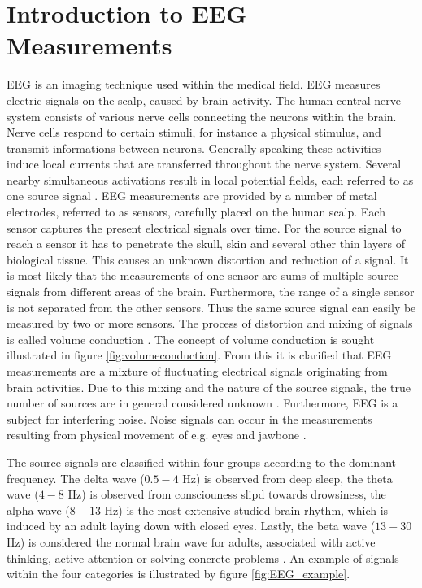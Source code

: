 \section{Introduction to EEG Measurements}\label{sec:EEG}
EEG is an imaging technique used within the medical field. EEG measures electric signals on the scalp, caused by brain activity. 
The human central nerve system consists of various nerve cells connecting the neurons within the brain. Nerve cells respond to certain stimuli, for instance a physical stimulus, and transmit informations between neurons.
Generally speaking these activities induce local currents that are transferred throughout the nerve system. 
Several nearby simultaneous activations result in local potential fields, each referred to as one source signal \cite{EEGsignalprocessing}. 
EEG measurements are provided by a number of metal electrodes, referred to as sensors, carefully placed on the human scalp. 
Each sensor captures the present electrical signals over time.
For the source signal to reach a sensor it has to penetrate the skull, skin and several other thin layers of biological tissue. 
This causes an unknown distortion and reduction of a signal.
It is most likely that the measurements of one sensor are sums of multiple source signals from different areas of the brain.
Furthermore, the range of a single sensor is not separated from the other sensors. 
Thus the same source signal can easily be measured by two or more sensors.
The process of distortion and mixing of signals is called volume conduction \cite{EEGsignalprocessing}\cite{Van2019}. 
The concept of volume conduction is sought illustrated in figure \ref{fig:volumeconduction}.
From this it is clarified that EEG measurements are a mixture of fluctuating electrical signals originating from brain activities. Due to this mixing and the nature of the source signals, the true number of sources are in general considered unknown \cite{EEGsignalprocessing}. 
Furthermore, EEG is a subject for interfering noise. Noise signals can occur in the measurements resulting from physical movement of e.g. eyes and jawbone \cite{fundamentalEEG}.

The source signals are classified within four groups according to the dominant frequency. 
The delta wave ($0.5-4$ Hz) is observed from deep sleep, the theta wave ($4-8$ Hz) is observed from consciouness slipd towards drowsiness, the alpha wave ($8-13$ Hz) is the most extensive studied brain rhythm, which is induced by an adult laying down with closed eyes. 
Lastly, the beta wave ($13-30$ Hz) is considered the normal brain wave for adults, associated with active thinking, active attention or solving concrete problems \cite[p. 10]{EEGsignalprocessing}. 
An example of signals within the four categories is illustrated by figure \ref{fig:EEG_example}. 

